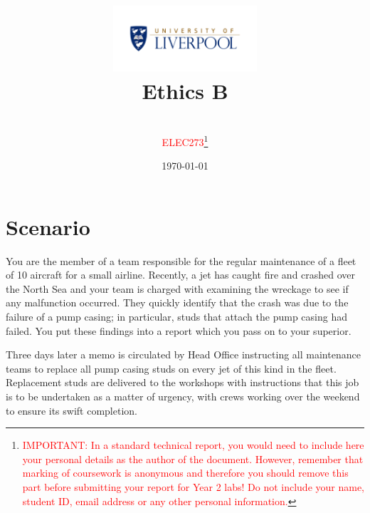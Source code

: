 \documentclass[11pt, a4paper]{article}
\title{\includegraphics[width=0.4\textwidth]{UnivCrest}
        \\Ethics B}          %
\author{%
        \\  \textcolor{red}{ELEC273}\footnote{\textcolor{red}{IMPORTANT: In a standard technical report, you would need to include here your personal details as the author of the document. However, remember that marking of coursework is anonymous and therefore you should remove this part before submitting your report for Year 2 labs! Do not include your name, student ID, email address or any other personal information.}}}                                    %
\date{\tiny{\today}}
\begin{document}
\begin{titlepage}
\maketitle
{} %



\thispagestyle{empty}
\tableofcontents
\end{titlepage}


\section{Scenario}
You are the member of a team responsible for the regular maintenance of a fleet of 10 aircraft for a small airline. Recently, a jet has caught fire and crashed over the North Sea and your team is charged with examining the wreckage to see if any malfunction occurred. They quickly identify that the crash was due to the failure of a pump casing; in particular, studs that attach the pump casing had failed. You put these findings into a report which you pass on to your superior.

Three days later a memo is circulated by Head Office instructing all maintenance teams to replace all pump casing studs on every jet of this kind in the fleet. Replacement studs are delivered to the workshops with instructions that this job is to be undertaken as a matter of urgency, with crews working over the weekend to ensure its swift completion.
\end{document}
